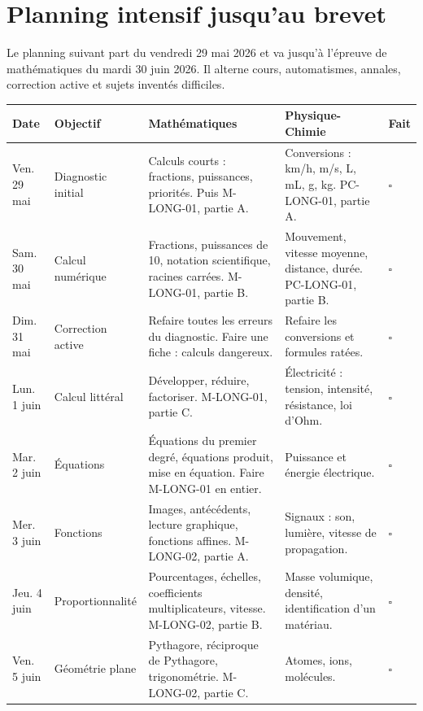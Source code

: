 \documentclass[11pt,a4paper]{article}
\newcounter{correction}
\begin{document}
\newpage
\section{Planning intensif jusqu'au brevet}

\begin{objectif}
Le planning suivant part du vendredi 29 mai 2026 et va jusqu'à l'épreuve de mathématiques du mardi 30 juin 2026. Il alterne cours, automatismes, annales, correction active et sujets inventés difficiles.
\end{objectif}

\renewcommand{\arraystretch}{1.35}
\begin{longtable}{|p{2.3cm}|p{3.2cm}|p{4.7cm}|p{4.7cm}|p{0.7cm}|}
\hline
\textbf{Date} & \textbf{Objectif} & \textbf{Mathématiques} & \textbf{Physique-Chimie} & \textbf{Fait} \\
\hline
Ven. 29 mai & Diagnostic initial & Calculs courts : fractions, puissances, priorités. Puis M-LONG-01, partie A. & Conversions : km/h, m/s, L, mL, g, kg. PC-LONG-01, partie A. & $\square$ \\
\hline
Sam. 30 mai & Calcul numérique & Fractions, puissances de 10, notation scientifique, racines carrées. M-LONG-01, partie B. & Mouvement, vitesse moyenne, distance, durée. PC-LONG-01, partie B. & $\square$ \\
\hline
Dim. 31 mai & Correction active & Refaire toutes les erreurs du diagnostic. Faire une fiche : calculs dangereux. & Refaire les conversions et formules ratées. & $\square$ \\
\hline
Lun. 1 juin & Calcul littéral & Développer, réduire, factoriser. M-LONG-01, partie C. & Électricité : tension, intensité, résistance, loi d'Ohm. & $\square$ \\
\hline
Mar. 2 juin & Équations & Équations du premier degré, équations produit, mise en équation. Faire M-LONG-01 en entier. & Puissance et énergie électrique. & $\square$ \\
\hline
Mer. 3 juin & Fonctions & Images, antécédents, lecture graphique, fonctions affines. M-LONG-02, partie A. & Signaux : son, lumière, vitesse de propagation. & $\square$ \\
\hline
Jeu. 4 juin & Proportionnalité & Pourcentages, échelles, coefficients multiplicateurs, vitesse. M-LONG-02, partie B. & Masse volumique, densité, identification d'un matériau. & $\square$ \\
\hline
Ven. 5 juin & Géométrie plane & Pythagore, réciproque de Pythagore, trigonométrie. M-LONG-02, partie C. & Atomes, ions, molécules. & $\square$ \\

\end{longtable}
\end{document}
